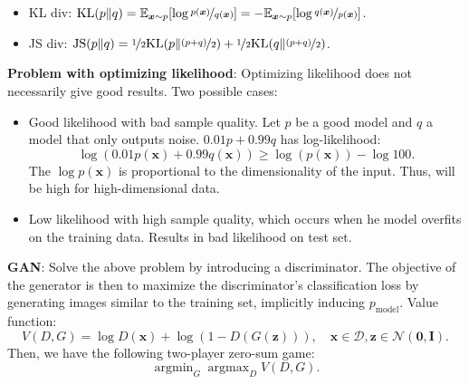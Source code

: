 \documentclass{article}
\DeclareMathOperator*{\argmax}{argmax}
\DeclareMathOperator*{\argmin}{argmin}
\newcommand{\lft}{\mathopen{}\mathclose\bgroup\left}
\newcommand{\rgt}{\aftergroup\egroup\right}
\newcommand{\E}{\mathbb{E}}
\renewcommand{\vec}[1]{\bm{#1}}
\newcommand{\mat}[1]{\bm{#1}}
\newenvironment{topic}[1]
{\textbf{\sffamily \colorbox{black}{\rlap{\textbf{\textcolor{white}{#1}}}\hspace{\linewidth}\hspace{-2\fboxsep}}} \\ \vspace{0.2cm}}
{}
\begin{document}
\begin{multicols*}{2}
\begin{topic}{Normalizing flow}
    \end{topic}

    \begin{topic}{Generative adversarial network}

        \begin{itemize}
            \item KL div: $\mathrm{KL}(p \lVert q) = \E_{\vec{x} \sim p} \lft[ \log \nicefrac{p(\vec{x})}{q(\vec{x})}
                          \rgt] = - \E_{\vec{x} \sim p} \lft[ \log \nicefrac{q(\vec{x})}{p(\vec{x})} \rgt]$.
            \item JS div: $\mathrm{JS}(p \lVert q) = \nicefrac{1}{2} \mathrm{KL}\lft(p \middle\lVert \nicefrac{(p +
                              q)}{2} \rgt) + \nicefrac{1}{2} \mathrm{KL}\lft( q \middle\lVert \nicefrac{(p + q)}{2} \rgt)$.
        \end{itemize}

        \textbf{Problem with optimizing likelihood}: Optimizing likelihood does not necessarily give good results. Two possible cases:
        \begin{itemize}
            \item Good likelihood with bad sample quality. Let $p$ be a good model and $q$ a model that only outputs
                  noise. $0.01p + 0.99q$ has log-likelihood: \[
                      \log(0.01p(\vec{x}) + 0.99q(\vec{x})) \geq \log(p(\vec{x})) - \log 100.
                  \]
                  The $\log p(\vec{x})$ is proportional to the dimensionality of the input. Thus, will be high for
                  high-dimensional data.

            \item Low likelihood with high sample quality, which occurs when he model overfits on the training data.
                  Results in bad likelihood on test set.

        \end{itemize}

        \textbf{GAN}: Solve the above problem by introducing a discriminator. The objective of the
        generator is then to maximize the discriminator's classification loss by generating images
        similar to the training set, implicitly inducing $p_{\mathrm{model}}$. Value function: \[
            V(D, G) = \log D(\vec{x}) + \log (1 - D(G(\vec{z}))), \quad \vec{x} \in \mathcal{D}, \vec{z} \in \mathcal{N}(\vec{0}, \mat{I}).
        \]
        Then, we have the following two-player zero-sum game: \[
            \argmin_G \argmax_D V(D,G).
        \]


\end{topic}
\end{multicols*}
\end{document}
